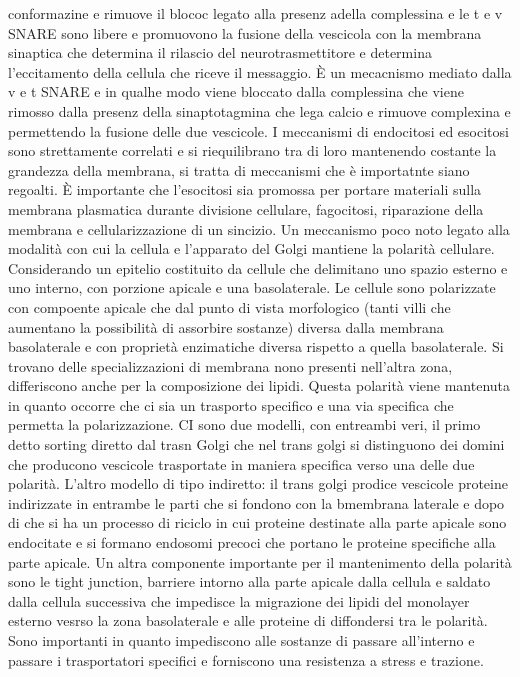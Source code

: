 conformazine e rimuove il blococ legato alla presenz adella complessina e le t e v SNARE sono libere e promuovono la fusione della vescicola con la membrana sinaptica che determina il
rilascio del neurotrasmettitore e determina l'eccitamento della cellula che riceve il messaggio. \`E un mecacnismo mediato dalla v e t SNARE e in qualhe modo viene bloccato dalla 
complessina che viene rimosso dalla presenz della sinaptotagmina che lega calcio e rimuove complexina e permettendo la fusione delle due vescicole. I meccanismi di endocitosi ed esocitosi
sono strettamente correlati e si riequilibrano tra di loro mantenendo costante la grandezza della membrana, si tratta di meccanismi che \`e importatnte siano regoalti. \`E importante
che l'esocitosi sia promossa per portare materiali sulla membrana plasmatica durante divisione cellulare, fagocitosi, riparazione della membrana e cellularizzazione di un sincizio. Un
meccanismo poco noto legato alla modalit\`a con cui la cellula e l'apparato del Golgi mantiene la polarit\`a cellulare. Considerando un epitelio costituito da cellule che delimitano 
uno spazio esterno e uno interno, con porzione apicale e una basolaterale. Le cellule sono polarizzate con compoente apicale che dal punto di vista morfologico (tanti villi che aumentano
la possibilit\`a di assorbire sostanze) diversa dalla membrana basolaterale e con propriet\`a enzimatiche diversa rispetto a quella basolaterale. Si trovano delle specializzazioni di 
membrana nono presenti nell'altra zona, differiscono anche per la composizione dei lipidi. Questa polarit\`a viene mantenuta in quanto occorre che ci sia un trasporto specifico e una
via specifica che permetta la polarizzazione. CI sono due modelli, con entreambi veri, il primo detto sorting diretto dal trasn Golgi che nel trans golgi si distinguono dei domini che
producono vescicole trasportate in maniera specifica verso una delle due polarit\`a. L'altro modello di tipo indiretto: il trans golgi prodice vescicole proteine indirizzate in entrambe
le parti che si fondono con la bmembrana laterale e dopo di che si ha un processo di riciclo in cui proteine destinate alla parte apicale sono endocitate e si formano endosomi precoci che
portano le proteine specifiche alla parte apicale. Un altra componente importante per il mantenimento della polarit\`a sono le tight junction, barriere intorno alla parte apicale dalla
cellula e saldato dalla cellula successiva che impedisce la migrazione dei lipidi del monolayer esterno vesrso la zona basolaterale e alle proteine di diffondersi tra le polarit\`a. Sono
importanti in quanto impediscono alle sostanze di passare all'interno e passare i trasportatori specifici e forniscono una resistenza a stress e trazione. 

